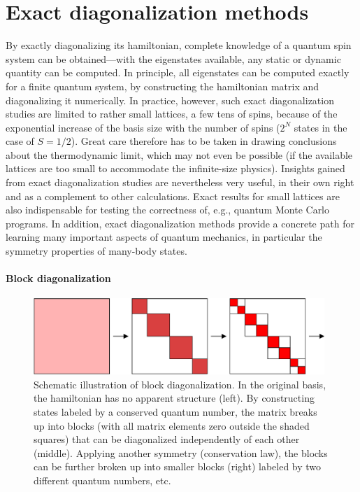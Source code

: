 \documentclass[draft,numberedheadings]{aipproc}
\begin{document}
\section{Exact diagonalization methods}
\label{sec_diag}

By exactly diagonalizing its hamiltonian, complete knowledge of a quantum spin system can be obtained---with the eigenstates available, any static or dynamic 
quantity can be computed. In principle, all eigenstates can be computed exactly for a finite quantum system, by constructing the hamiltonian matrix and 
diagonalizing it numerically. In  practice, however, such exact diagonalization studies are limited to rather small lattices, a few tens of spins, because 
of the exponential increase of the basis 
size with the number of spins ($2^N$ states in the case of $S=1/2$). Great care therefore has to be taken in drawing conclusions about the thermodynamic limit, 
which may not even be possible (if the available lattices are too small to accommodate the infinite-size physics). Insights gained from exact diagonalization 
studies are nevertheless very useful, in their own right and as a complement to other calculations. Exact results for small lattices are also indispensable 
for testing the correctness of, e.g., quantum Monte Carlo programs. In addition, exact diagonalization methods provide a concrete path for learning many 
important aspects of quantum mechanics, in particular the symmetry properties of many-body states. 
 
\paragraph{Block diagonalization}

\begin{figure}[t]
\includegraphics[width=11cm, clip]{hamblocks.eps}
\caption{Schematic illustration of block diagonalization. In the original basis, the hamiltonian has no apparent structure (left). By constructing 
states labeled by a conserved quantum number, the matrix breaks up into blocks (with all matrix elements zero outside the shaded squares) that 
can be diagonalized independently of each other (middle). Applying another symmetry (conservation law), the blocks can be further broken up 
into smaller blocks (right) labeled by two different quantum numbers, etc.}
\label{hamblocks}
\end{figure}
\vskip5mm
\end{document}
